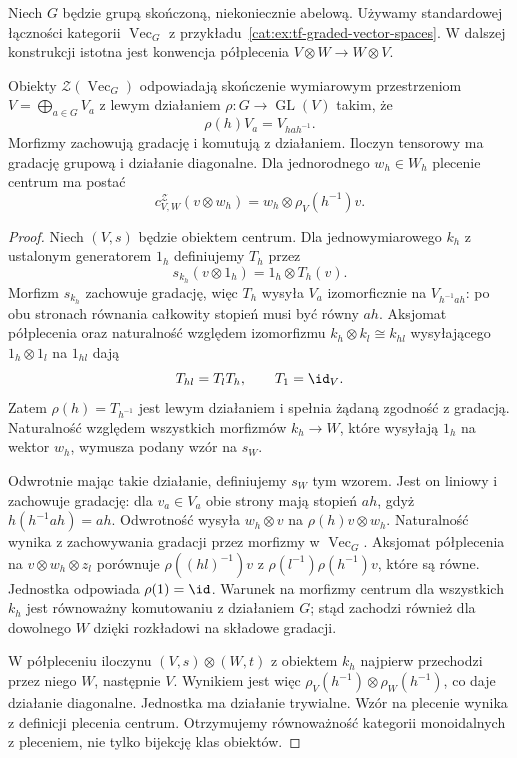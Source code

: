 Niech $G$ będzie grupą skończoną, niekoniecznie abelową. Używamy standardowej łączności kategorii $\operatorname{Vec}_G$ z przykładu~\ref{cat:ex:tf-graded-vector-spaces}. W dalszej konstrukcji istotna jest konwencja półplecenia $V\otimes W\to W\otimes V$.

\begin{twierdzenie}\label{cat:thm:tf-center-vecg}
Obiekty $\mathcal Z(\operatorname{Vec}_G)$ odpowiadają skończenie wymiarowym przestrzeniom $V=\bigoplus_{a\in G}V_a$ z lewym działaniem $\rho:G\to\operatorname{GL}(V)$ takim, że
\[
 \rho(h)V_a=V_{hah^{-1}}.
\]
Morfizmy zachowują gradację i komutują z działaniem. Iloczyn tensorowy ma gradację grupową i działanie diagonalne. Dla jednorodnego $w_h\in W_h$ plecenie centrum ma postać
\[
 c^{\mathcal Z}_{V,W}(v\otimes w_h)=w_h\otimes\rho_V(h^{-1})v.
\]
\end{twierdzenie}
\begin{proof}
Niech $(V,s)$ będzie obiektem centrum. Dla jednowymiarowego $k_h$ z ustalonym generatorem $1_h$ definiujemy $T_h$ przez
\[
 s_{k_h}(v\otimes1_h)=1_h\otimes T_h(v).
\]
Morfizm $s_{k_h}$ zachowuje gradację, więc $T_h$ wysyła $V_a$ izomorficznie na $V_{h^{-1}ah}$: po obu stronach równania całkowity stopień musi być równy $ah$. Aksjomat półplecenia oraz naturalność względem izomorfizmu $k_h\otimes k_l\cong k_{hl}$ wysyłającego $1_h\otimes1_l$ na $1_{hl}$ dają
\[
 T_{hl}=T_lT_h,\qquad T_1=\id_V.
\]
Zatem $\rho(h)=T_{h^{-1}}$ jest lewym działaniem i spełnia żądaną zgodność z gradacją. Naturalność względem wszystkich morfizmów $k_h\to W$, które wysyłają $1_h$ na wektor $w_h$, wymusza podany wzór na $s_W$.

Odwrotnie mając takie działanie, definiujemy $s_W$ tym wzorem. Jest on liniowy i zachowuje gradację: dla $v_a\in V_a$ obie strony mają stopień $ah$, gdyż $h(h^{-1}ah)=ah$. Odwrotność wysyła $w_h\otimes v$ na $\rho(h)v\otimes w_h$. Naturalność wynika z zachowywania gradacji przez morfizmy w $\operatorname{Vec}_G$. Aksjomat półplecenia na $v\otimes w_h\otimes z_l$ porównuje $\rho((hl)^{-1})v$ z $\rho(l^{-1})\rho(h^{-1})v$, które są równe. Jednostka odpowiada $\rho(1)=\id$. Warunek na morfizmy centrum dla wszystkich $k_h$ jest równoważny komutowaniu z działaniem $G$; stąd zachodzi również dla dowolnego $W$ dzięki rozkładowi na składowe gradacji.

W półpleceniu iloczynu $(V,s)\otimes(W,t)$ z obiektem $k_h$ najpierw przechodzi przez niego $W$, następnie $V$. Wynikiem jest więc $\rho_V(h^{-1})\otimes\rho_W(h^{-1})$, co daje działanie diagonalne. Jednostka ma działanie trywialne. Wzór na plecenie wynika z definicji plecenia centrum. Otrzymujemy równoważność kategorii monoidalnych z pleceniem, nie tylko bijekcję klas obiektów.
\end{proof}

